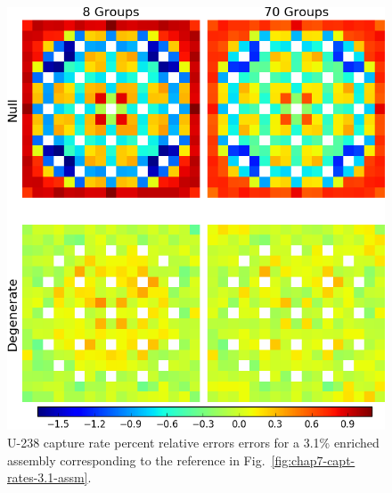 \clearpage

\begin{figure}[h!]
\centering
\includegraphics[width=\linewidth]{figures/quantification/assm-31/capt-err}
\vspace{2mm}
\caption[U-238 capture rate errors for a 3.1\% enriched assembly]{U-238 capture rate percent relative errors errors for a 3.1\% enriched assembly corresponding to the reference in Fig.~\ref{fig:chap7-capt-rates-3.1-assm}.}
\label{fig:chap8-assm-3.1-capt-err}
\end{figure}

\clearpage


